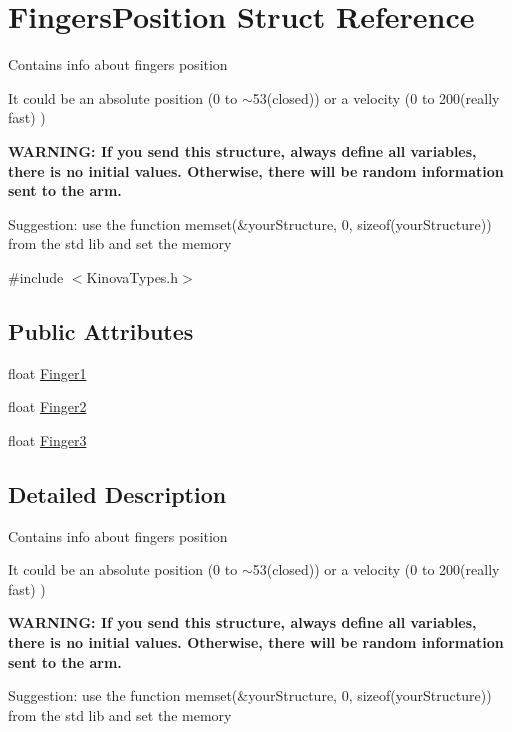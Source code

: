 \hypertarget{struct_fingers_position}{\section{Fingers\-Position Struct Reference}
\label{struct_fingers_position}
}


\par
Contains info about fingers position \par
It could be an absolute position (0 to $\sim$53(closed)) or a velocity (0 to 200(really fast) ) \par
{\bfseries W\-A\-R\-N\-I\-N\-G\-: If you send this structure, always define all variables, there is no initial values. Otherwise, there will be random information sent to the arm.} \par
Suggestion\-: use the function memset(\&your\-Structure, 0, sizeof(your\-Structure)) from the std lib and set the memory  




{\ttfamily \#include $<$Kinova\-Types.\-h$>$}

\subsection*{Public Attributes}
\begin{DoxyCompactItemize}
\item 
float \hyperlink{struct_fingers_position_a216f8d64e6a9c7aab84e4269ccb27e66}{Finger1}
\item 
float \hyperlink{struct_fingers_position_a0ec9675672721d61fb13bbc2db3d3ef9}{Finger2}
\item 
float \hyperlink{struct_fingers_position_a03c819e4c20367e36e62a864bf829160}{Finger3}
\end{DoxyCompactItemize}


\subsection{Detailed Description}
\par
Contains info about fingers position \par
It could be an absolute position (0 to $\sim$53(closed)) or a velocity (0 to 200(really fast) ) \par
{\bfseries W\-A\-R\-N\-I\-N\-G\-: If you send this structure, always define all variables, there is no initial values. Otherwise, there will be random information sent to the arm.} \par
Suggestion\-: use the function memset(\&your\-Structure, 0, sizeof(your\-Structure)) from the std lib and set the memory 



